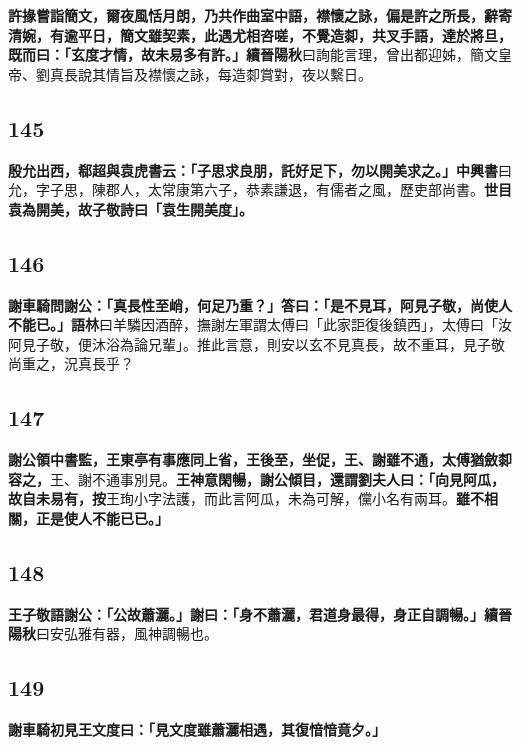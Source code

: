 \textbf{許掾嘗詣簡文，爾夜風恬月朗，乃共作曲室中語，襟懷之詠，偏是許之所長，辭寄清婉，有逾平日，簡文雖契素，此遇尤相咨嗟，不覺造厀，共叉手語，達於將旦，既而曰：「玄度才情，故未易多有許。」}{\footnotesize \textbf{續晉陽秋}曰詢能言理，曾出都迎姊，簡文皇帝、劉真長說其情旨及襟懷之詠，每造厀賞對，夜以繫日。}

\subsection*{145}

\textbf{殷允出西，郗超與袁虎書云：「子思求良朋，託好足下，勿以開美求之。」}{\footnotesize \textbf{中興書}曰允，字子思，陳郡人，太常康第六子，恭素謙退，有儒者之風，歷吏部尚書。}\textbf{世目袁為開美，故子敬詩曰「袁生開美度」。}

\subsection*{146}

\textbf{謝車騎問謝公：「真長性至峭，何足乃重？」答曰：「是不見耳，阿見子敬，尚使人不能已。」}{\footnotesize \textbf{語林}曰羊驎因酒醉，撫謝左軍謂太傅曰「此家詎復後鎮西」，太傅曰「汝阿見子敬，便沐浴為論兄輩」。推此言意，則安以玄不見真長，故不重耳，見子敬尚重之，況真長乎？}

\subsection*{147}

\textbf{謝公領中書監，王東亭有事應同上省，王後至，坐促，王、謝雖不通，太傅猶斂厀容之，}{\footnotesize 王、謝不通事別見。}\textbf{王神意閑暢，謝公傾目，還謂劉夫人曰：「向見阿瓜，故自未易有，}{\footnotesize \textbf{按}王珣小字法護，而此言阿瓜，未為可解，儻小名有兩耳。}\textbf{雖不相關，正是使人不能已已。」}

\subsection*{148}

\textbf{王子敬語謝公：「公故蕭灑。」謝曰：「身不蕭灑，君道身最得，身正自調暢。」}{\footnotesize \textbf{續晉陽秋}曰安弘雅有器，風神調暢也。}

\subsection*{149}

\textbf{謝車騎初見王文度曰：「見文度雖蕭灑相遇，其復愔愔竟夕。」}


